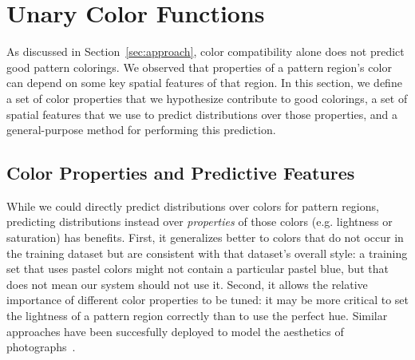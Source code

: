 \section{Unary Color Functions}
\label{sec:unary}

As discussed in Section~\ref{sec:approach}, color compatibility alone does not predict good pattern colorings. We observed that properties of a pattern region's color can depend on some key spatial features of that region. In this section, we define a set of color properties that we hypothesize contribute to good colorings, a set of spatial features that we use to predict distributions over those properties, and a general-purpose method for performing this prediction.

\subsection{Color Properties and Predictive Features}
\label{sec:unaryPropsAndFeatures}

While we could directly predict distributions over colors for pattern regions, predicting distributions instead over \emph{properties} of those colors (e.g. lightness or saturation) has benefits. First, it generalizes better to colors that do not occur in the training dataset but are consistent with that dataset's overall style: a training set that uses pastel colors might not contain a particular pastel blue, but that does not mean our system should not use it. Second, it allows the relative importance of different color properties to be tuned: it may be more critical to set the lightness of a pattern region correctly than to use the perfect hue. Similar approaches have been succesfully deployed to model the aesthetics of photographs~\cite{PhotoAesthetics}.

